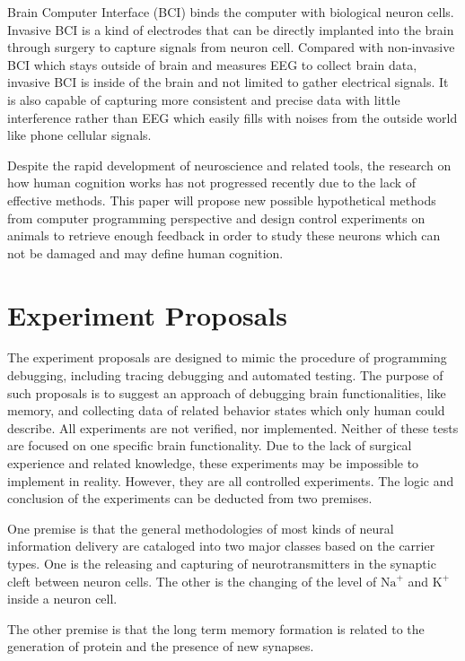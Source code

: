 \documentclass[conference]{IEEEtran}
\begin{document}
Brain Computer Interface (BCI) binds the computer with biological neuron cells. Invasive BCI is a kind of electrodes that can be directly implanted into the brain through surgery to capture signals from neuron cell. Compared with non-invasive BCI which stays outside of brain and measures EEG to collect brain data, invasive BCI is inside of the brain and not limited to gather electrical signals. It is also capable of capturing more consistent and precise data with little interference rather than EEG which easily fills with noises from the outside world like phone cellular signals.

Despite the rapid development of neuroscience and related tools, the research on how human cognition works has not progressed recently due to the lack of effective methods. This paper will propose new possible hypothetical methods from computer programming perspective and design control experiments on animals to retrieve enough feedback in order to study these neurons which can not be damaged and may define human cognition.

\section{Experiment Proposals}

The experiment proposals are designed to mimic the procedure of programming debugging, including tracing debugging and automated testing. The purpose of such proposals is to suggest an approach of debugging brain functionalities, like memory, and collecting data of related behavior states which only human could describe. All experiments are not verified, nor implemented. Neither of these tests are focused on one specific brain functionality. Due to the lack of surgical experience and related knowledge, these experiments may be impossible to implement in reality. However, they are all controlled experiments. The logic and conclusion of the experiments can be deducted from two premises.

One premise is that the general methodologies of most kinds of neural information delivery are cataloged into two major classes based on the carrier types. One is the releasing and capturing of neurotransmitters in the synaptic cleft between neuron cells. The other is the changing of the level of $\text{Na}^{+}$ and $\text{K}^{+}$ inside a neuron cell.  

The other premise is that the long term memory formation is related to the generation of protein and the presence of new synapses.
\end{document}
